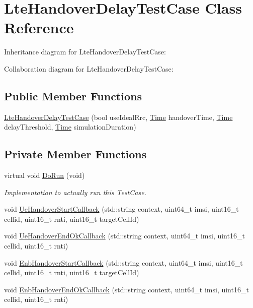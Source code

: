 \hypertarget{classLteHandoverDelayTestCase}{}\section{Lte\+Handover\+Delay\+Test\+Case Class Reference}
\label{classLteHandoverDelayTestCase}


Inheritance diagram for Lte\+Handover\+Delay\+Test\+Case\+:


Collaboration diagram for Lte\+Handover\+Delay\+Test\+Case\+:
\subsection*{Public Member Functions}
\begin{DoxyCompactItemize}
\item 
\hyperlink{classLteHandoverDelayTestCase_af6defaadda608c334b5105ed043abc5c}{Lte\+Handover\+Delay\+Test\+Case} (bool use\+Ideal\+Rrc, \hyperlink{classns3_1_1Time}{Time} handover\+Time, \hyperlink{classns3_1_1Time}{Time} delay\+Threshold, \hyperlink{classns3_1_1Time}{Time} simulation\+Duration)
\end{DoxyCompactItemize}
\subsection*{Private Member Functions}
\begin{DoxyCompactItemize}
\item 
virtual void \hyperlink{classLteHandoverDelayTestCase_a2e5214b6dd2249de91ba0aa326b8c97d}{Do\+Run} (void)
\begin{DoxyCompactList}\small\item\em Implementation to actually run this Test\+Case. \end{DoxyCompactList}\item 
void \hyperlink{classLteHandoverDelayTestCase_a7264e1ec847d4af71168e6bbc0470ca4}{Ue\+Handover\+Start\+Callback} (std\+::string context, uint64\+\_\+t imsi, uint16\+\_\+t cellid, uint16\+\_\+t rnti, uint16\+\_\+t target\+Cell\+Id)
\item 
void \hyperlink{classLteHandoverDelayTestCase_a48877098b2c388ff961a4c31171b2583}{Ue\+Handover\+End\+Ok\+Callback} (std\+::string context, uint64\+\_\+t imsi, uint16\+\_\+t cellid, uint16\+\_\+t rnti)
\item 
void \hyperlink{classLteHandoverDelayTestCase_a01717887b6978920983a3c3264bbd5ba}{Enb\+Handover\+Start\+Callback} (std\+::string context, uint64\+\_\+t imsi, uint16\+\_\+t cellid, uint16\+\_\+t rnti, uint16\+\_\+t target\+Cell\+Id)
\item 
void \hyperlink{classLteHandoverDelayTestCase_a8d120f217e0a9a426eb44f3923d24290}{Enb\+Handover\+End\+Ok\+Callback} (std\+::string context, uint64\+\_\+t imsi, uint16\+\_\+t cellid, uint16\+\_\+t rnti)
\end{DoxyCompactItemize}
